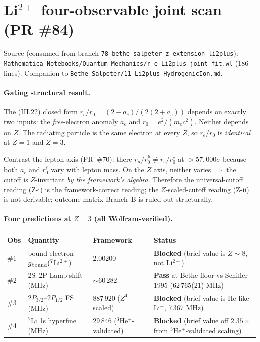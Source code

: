 \section{Li$^{2+}$ four-observable joint scan (PR \#84)}
\label{sec:eq-li2plus-joint-fit}

Source (consumed from branch
\texttt{78-bethe-salpeter-z-extension-li2plus}):
\texttt{Mathematica\_Notebooks/Quantum\_Mechanics/r\_e\_Li2plus\_joint\_fit.wl}
(186 lines).
Companion to
\texttt{Bethe\_Salpeter/11\_Li2plus\_HydrogenicIon.md}.

\paragraph{Gating structural result.}
The (III.22) closed form $r_e/r_0 = (2 - a_e)/(2(2 + a_e))$ depends on exactly
two inputs: the \emph{free}-electron anomaly $a_e$ and
$r_0 = e^2/(m_e c^2)$. Neither depends on $Z$. The radiating particle is the
same electron at every $Z$, so $r_e/r_0$ is \emph{identical} at $Z=1$ and
$Z=3$.

Contrast the lepton axis (PR~\#70): there $r_\mu/r_0^\mu \neq r_e/r_0^e$ at
$>57{,}000\sigma$ because both $a_\ell$ and $r_0^\ell$ vary with lepton mass.
On the $Z$ axis, neither varies $\Rightarrow$ the cutoff is $Z$-invariant
\emph{by the framework's algebra}. Therefore the universal-cutoff reading
(Z-i) is the framework-correct reading; the $Z$-scaled-cutoff reading (Z-ii)
is not derivable; outcome-matrix Branch~B is ruled out structurally.

\paragraph{Four predictions at $Z=3$ (all Wolfram-verified).}
\begin{center}
\begin{tabular}{llll}
\toprule
Obs & Quantity                          & Framework & Status \\
\midrule
\#1 & bound-electron $g_{\rm bound}(^7$Li$^{2+})$
   & $2.00200$
   & \textbf{Blocked} (brief value is $Z\!\sim\!8$, not Li$^{2+}$) \\
\#2 & 2S--2P Lamb shift (MHz)
   & $\sim 60\,282$
   & \textbf{Pass} at Bethe floor vs Schiffer 1995 (62\,765(21) MHz) \\
\#3 & $2P_{3/2}$--$2P_{1/2}$ FS (MHz)
   & $887\,920$ ($Z^4$-scaled)
   & \textbf{Blocked} (brief value is He-like Li$^+$, 7\,367 MHz) \\
\#4 & $^7$Li 1s hyperfine (MHz)
   & $29\,846$ ($^3$He$^+$-validated)
   & \textbf{Blocked} (brief value off $2.35\times$ from $^3$He$^+$-validated scaling) \\
\bottomrule
\end{tabular}
\end{center}

